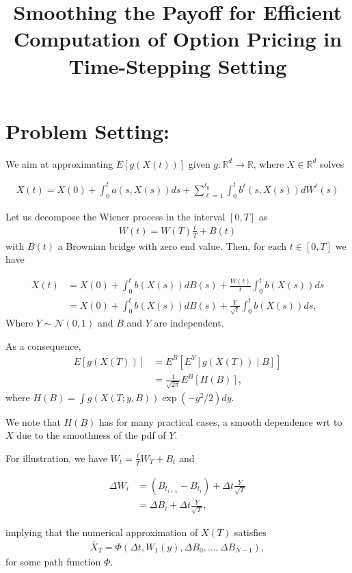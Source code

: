 \documentclass[11pt]{article}
\title{ Smoothing  the  Payoff for  Efficient Computation of Option Pricing in
  Time-Stepping Setting}
\date{ }
\begin{document}
\maketitle

\section{Problem Setting:}

We aim at approximating $E[g(X(t))]$ given $g:\mathbb{R}^d  \rightarrow \mathbb{R}$, where $X \in \mathbb{R}^d$ solves 

\begin{align}
X(t)=X(0)+ \int_{0}^{t} a(s,X(s)) ds + \sum_{\ell=1}^{\ell_0} \int_{0}^{t} b^{\ell}(s,X(s)) dW^{\ell}(s)
\end{align}

Let us decompose the Wiener process in the interval $[0, T]$ as
\begin{align}
W(t)=W(T) \frac{t}{T}+B(t)
\end{align}
with $B(t)$  a Brownian bridge with zero end value. Then,
for each $t \in [0, T]$ we have

\begin{align}
X(t) &=X(0)+\int_{0}^{t} b(X(s)) dB(s)+\frac{W(t)}{t} \int_{0}^{t} b(X(s)) ds\nonumber\\
&=X(0)+\int_{0}^{t} b(X(s)) dB(s)+\frac{Y}{\sqrt{t}} \int_{0}^{t} b(X(s))ds,
\end{align}
Where $Y \sim \mathcal{N}(0,1)$ and $B$ and $Y$ are independent.

As a consequence,
\begin{align}
E[g(X(T))]&= E^B[E^Y[g(X(T))\mid B]]\nonumber\\
&=\frac{1}{\sqrt{2 \pi}} E^B[H(B)],
\end{align}
where $H(B)=\int g(X(T;y,B)) \operatorname{exp}(-y^2/2) dy$.

We note that $H(B)$ has for many practical cases, a smooth dependence wrt to $X$ due to the smoothness of the pdf of $Y$.

For illustration, we have  $W_t=\frac{t}{T} W_T+B_t$ and 

\begin{align}\label{Brownian_bridge}
\Delta W_i&=(B_{t_{i+1}}-B_{t_i})+\Delta t \frac{Y}{\sqrt{T}} \nonumber\\
&= \Delta B_i + \Delta t \frac{Y}{\sqrt{T}},
\end{align}

implying that the numerical approximation of $X(T)$ satisfies
\begin{align}
\bar{X}_T=\Phi(\Delta t, W_1(y), \Delta B_0,\dots,\Delta B_{N-1}),
\end{align}
for some path function $\Phi$.
\end{document}
